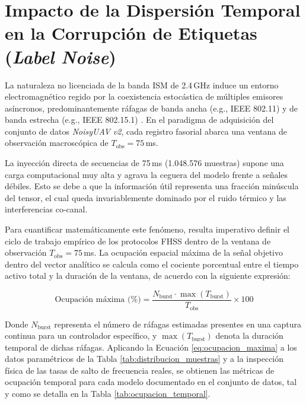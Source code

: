 \section{Impacto de la Dispersión Temporal en la Corrupción de Etiquetas (\textit{Label Noise})}
\label{sec:label_noise}

La naturaleza no licenciada de la banda ISM de 2.4\,GHz induce un entorno electromagnético regido por la coexistencia estocástica de múltiples emisores asíncronos, predominantemente ráfagas de banda ancha (e.g., IEEE 802.11) y de banda estrecha (e.g., IEEE 802.15.1) \cite{ezuma_detection_2020}. En el paradigma de adquisición del conjunto de datos \textit{NoisyUAV v2}, cada registro fasorial abarca una ventana de observación macroscópica de $T_{\text{obs}} = 75$\,ms. 

La inyección directa de secuencias de 75\,ms (1.048.576 muestras) supone una carga computacional muy alta y agrava la ceguera del modelo frente a señales débiles. Esto se debe a que la información útil representa una fracción minúscula del tensor, el cual queda invariablemente dominado por el ruido térmico y las interferencias co-canal.

Para cuantificar matemáticamente este fenómeno, resulta imperativo definir el ciclo de trabajo empírico de los protocolos FHSS dentro de la ventana de observación $T_{\text{obs}} = 75$\,ms. La ocupación espacial máxima de la señal objetivo dentro del vector analítico se calcula como el cociente porcentual entre el tiempo activo total y la duración de la ventana, de acuerdo con la siguiente expresión:

\begin{equation}
    \text{Ocupación máxima (\%)} = \frac{N_{\text{burst}} \cdot \max(T_{\text{burst}})}{T_{\text{obs}}} \times 100
    \label{eq:ocupacion_maxima}
\end{equation}

Donde $N_{\text{burst}}$ representa el número de ráfagas estimadas presentes en una captura continua para un controlador específico, y $\max(T_{\text{burst}})$ denota la duración temporal de dichas ráfagas. Aplicando la Ecuación \ref{eq:ocupacion_maxima} a los datos paramétricos de la Tabla \ref{tab:distribucion_muestras} y a la inspección física de las tasas de salto de frecuencia reales, se obtienen las métricas de ocupación temporal para cada modelo documentado en el conjunto de datos, tal y como se detalla en la Tabla \ref{tab:ocupacion_temporal}.

